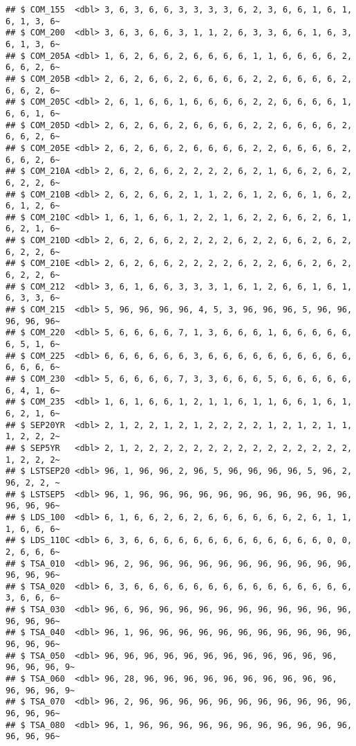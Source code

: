 \documentclass[
]{article}
\begin{document}
\begin{verbatim}
## $ COM_155  <dbl> 3, 6, 3, 6, 6, 3, 3, 3, 3, 6, 2, 3, 6, 6, 1, 6, 1, 6, 1, 3, 6~
## $ COM_200  <dbl> 3, 6, 3, 6, 6, 3, 1, 1, 2, 6, 3, 3, 6, 6, 1, 6, 3, 6, 1, 3, 6~
## $ COM_205A <dbl> 1, 6, 2, 6, 6, 2, 6, 6, 6, 6, 1, 1, 6, 6, 6, 6, 2, 6, 6, 2, 6~
## $ COM_205B <dbl> 2, 6, 2, 6, 6, 2, 6, 6, 6, 6, 2, 2, 6, 6, 6, 6, 2, 6, 6, 2, 6~
## $ COM_205C <dbl> 2, 6, 1, 6, 6, 1, 6, 6, 6, 6, 2, 2, 6, 6, 6, 6, 1, 6, 6, 1, 6~
## $ COM_205D <dbl> 2, 6, 2, 6, 6, 2, 6, 6, 6, 6, 2, 2, 6, 6, 6, 6, 2, 6, 6, 2, 6~
## $ COM_205E <dbl> 2, 6, 2, 6, 6, 2, 6, 6, 6, 6, 2, 2, 6, 6, 6, 6, 2, 6, 6, 2, 6~
## $ COM_210A <dbl> 2, 6, 2, 6, 6, 2, 2, 2, 2, 6, 2, 1, 6, 6, 2, 6, 2, 6, 2, 2, 6~
## $ COM_210B <dbl> 2, 6, 2, 6, 6, 2, 1, 1, 2, 6, 1, 2, 6, 6, 1, 6, 2, 6, 1, 2, 6~
## $ COM_210C <dbl> 1, 6, 1, 6, 6, 1, 2, 2, 1, 6, 2, 2, 6, 6, 2, 6, 1, 6, 2, 1, 6~
## $ COM_210D <dbl> 2, 6, 2, 6, 6, 2, 2, 2, 2, 6, 2, 2, 6, 6, 2, 6, 2, 6, 2, 2, 6~
## $ COM_210E <dbl> 2, 6, 2, 6, 6, 2, 2, 2, 2, 6, 2, 2, 6, 6, 2, 6, 2, 6, 2, 2, 6~
## $ COM_212  <dbl> 3, 6, 1, 6, 6, 3, 3, 3, 1, 6, 1, 2, 6, 6, 1, 6, 1, 6, 3, 3, 6~
## $ COM_215  <dbl> 5, 96, 96, 96, 96, 4, 5, 3, 96, 96, 96, 5, 96, 96, 96, 96, 96~
## $ COM_220  <dbl> 5, 6, 6, 6, 6, 7, 1, 3, 6, 6, 6, 1, 6, 6, 6, 6, 6, 6, 5, 1, 6~
## $ COM_225  <dbl> 6, 6, 6, 6, 6, 6, 3, 6, 6, 6, 6, 6, 6, 6, 6, 6, 6, 6, 6, 6, 6~
## $ COM_230  <dbl> 5, 6, 6, 6, 6, 7, 3, 3, 6, 6, 6, 5, 6, 6, 6, 6, 6, 6, 4, 1, 6~
## $ COM_235  <dbl> 1, 6, 1, 6, 6, 1, 2, 1, 1, 6, 1, 1, 6, 6, 1, 6, 1, 6, 2, 1, 6~
## $ SEP20YR  <dbl> 2, 1, 2, 2, 1, 2, 1, 2, 2, 2, 2, 1, 2, 1, 2, 1, 1, 1, 2, 2, 2~
## $ SEP5YR   <dbl> 2, 1, 2, 2, 2, 2, 2, 2, 2, 2, 2, 2, 2, 2, 2, 2, 2, 1, 2, 2, 2~
## $ LSTSEP20 <dbl> 96, 1, 96, 96, 2, 96, 5, 96, 96, 96, 96, 5, 96, 2, 96, 2, 2, ~
## $ LSTSEP5  <dbl> 96, 1, 96, 96, 96, 96, 96, 96, 96, 96, 96, 96, 96, 96, 96, 96~
## $ LDS_100  <dbl> 6, 1, 6, 6, 2, 6, 2, 6, 6, 6, 6, 6, 6, 2, 6, 1, 1, 1, 6, 6, 6~
## $ LDS_110C <dbl> 6, 3, 6, 6, 6, 6, 6, 6, 6, 6, 6, 6, 6, 6, 6, 0, 0, 2, 6, 6, 6~
## $ TSA_010  <dbl> 96, 2, 96, 96, 96, 96, 96, 96, 96, 96, 96, 96, 96, 96, 96, 96~
## $ TSA_020  <dbl> 6, 3, 6, 6, 6, 6, 6, 6, 6, 6, 6, 6, 6, 6, 6, 6, 6, 3, 6, 6, 6~
## $ TSA_030  <dbl> 96, 6, 96, 96, 96, 96, 96, 96, 96, 96, 96, 96, 96, 96, 96, 96~
## $ TSA_040  <dbl> 96, 1, 96, 96, 96, 96, 96, 96, 96, 96, 96, 96, 96, 96, 96, 96~
## $ TSA_050  <dbl> 96, 96, 96, 96, 96, 96, 96, 96, 96, 96, 96, 96, 96, 96, 96, 9~
## $ TSA_060  <dbl> 96, 28, 96, 96, 96, 96, 96, 96, 96, 96, 96, 96, 96, 96, 96, 9~
## $ TSA_070  <dbl> 96, 2, 96, 96, 96, 96, 96, 96, 96, 96, 96, 96, 96, 96, 96, 96~
## $ TSA_080  <dbl> 96, 1, 96, 96, 96, 96, 96, 96, 96, 96, 96, 96, 96, 96, 96, 96~

\end{verbatim}
\end{document}
